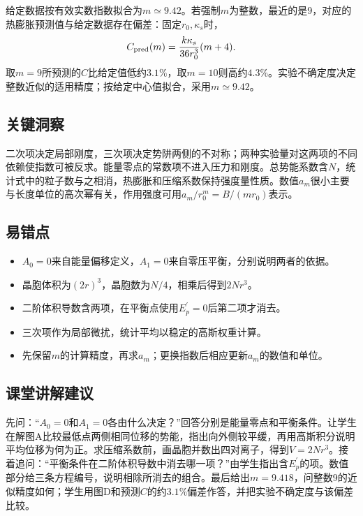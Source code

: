 \documentclass[UTF8,fontset=fandol,a4paper,11pt]{ctexart}
\begin{document}
给定数据按有效实数指数拟合为$m\simeq9.42$。若强制$m$为整数，最近的是9，对应的热膨胀预测值与给定数据存在偏差：固定$r_0,\kappa_s$时，
\[
C_{\rm pred}(m)=\frac{k\kappa_s}{36r_0^3}(m+4).
\]
取$m=9$所预测的$C$比给定值低约$3.1\%$，取$m=10$则高约$4.3\%$。实验不确定度决定整数近似的适用精度；按给定中心值拟合，采用$m\simeq9.42$。




\subsection*{关键洞察}

二次项决定局部刚度，三次项决定势阱两侧的不对称；两种实验量对这两项的不同依赖使指数可被反求。能量零点的常数项不进入压力和刚度。总势能系数含$N$，统计式中的粒子数与之相消，热膨胀和压缩系数保持强度量性质。数值$a_m$很小主要与长度单位的高次幂有关，作用强度可用$a_m/r_0^m=B/(mr_0)$表示。



\subsection*{易错点}

\begin{itemize}
\item $A_0=0$来自能量偏移定义，$A_1=0$来自零压平衡，分别说明两者的依据。
\item 晶胞体积为$(2r)^3$，晶胞数为$N/4$，相乘后得到$2Nr^3$。
\item 二阶体积导数含两项，在平衡点使用$E_p^\prime=0$后第二项才消去。
\item 三次项作为局部微扰，统计平均以稳定的高斯权重计算。
\item 先保留$m$的计算精度，再求$a_m$；更换指数后相应更新$a_m$的数值和单位。
\end{itemize}



\subsection*{课堂讲解建议}

先问：“$A_0=0$和$A_1=0$各由什么决定？”回答分别是能量零点和平衡条件。让学生在解图A比较最低点两侧相同位移的势能，指出向外侧较平缓，再用高斯积分说明平均位移为何为正。求压缩系数前，画晶胞并数出四对离子，得到$V=2Nr^3$。接着追问：“平衡条件在二阶体积导数中消去哪一项？”由学生指出含$E_p^\prime$的项。数值部分给三条方程编号，说明相除所消去的组合。最后给出$m=9.418$，问整数9的近似精度如何；学生用图D和预测$C$的约$3.1\%$偏差作答，并把实验不确定度与该偏差比较。
\end{document}
